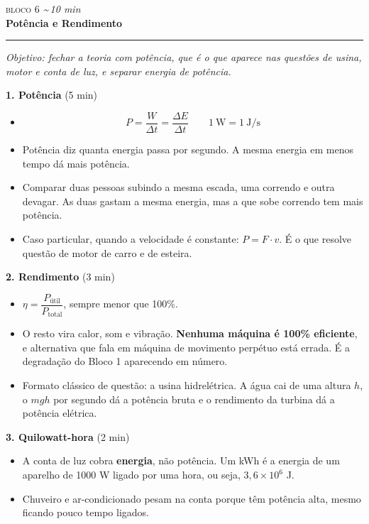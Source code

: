 \documentclass[11pt,a4paper]{article}
\newcommand{\bloco}[3]{%
  \needspace{7\baselineskip}
  \vspace{1.8em}
  {\scshape\color{vinho}bloco #1}\hfill
    {\small\itshape\color{grafite}\textasciitilde\,#3 min}\\[0.1em]
  {\Large\bfseries #2}\\[-0.55em]
  {\color{black!30}\rule{\linewidth}{0.5pt}}
  \par\nobreak\smallskip
}
\newcommand{\objetivo}[1]{{\itshape\color{grafite}Objetivo: #1}\par\smallskip}
\begin{document}
\bloco{6}{Pot\^encia e Rendimento}{10}

\objetivo{fechar a teoria com pot\^encia, que \'e o que aparece nas
quest\~oes de usina, motor e conta de luz, e separar energia de
pot\^encia.}

\begin{quadro}
\textbf{1. Pot\^encia} (5 min)
\begin{itemize}[nosep]
  \item
  \[
    \boxed{P = \frac{W}{\Delta t} = \frac{\Delta E}{\Delta t}}
    \qquad
    1\ \text{W} = 1\ \text{J/s}
  \]
  \item Pot\^encia diz quanta energia passa por
        segundo. A mesma energia em menos tempo d\'a mais pot\^encia.
  \item Comparar duas pessoas subindo a mesma escada, uma correndo e
        outra devagar. As duas gastam a mesma energia, mas a que sobe
        correndo tem mais pot\^encia.
  \item Caso particular, quando a velocidade \'e constante:
        $P = F\cdot v$. \'E o que resolve quest\~ao de motor de carro e
        de esteira.
\end{itemize}

\medskip
\textbf{2. Rendimento} (3 min)
\begin{itemize}[nosep]
  \item $\eta = \dfrac{P_{\text{\'util}}}{P_{\text{total}}}$, sempre
        menor que 100\%.
  \item O resto vira calor, som e vibra\c{c}\~ao. \textbf{Nenhuma
        m\'aquina \'e 100\% eficiente}, e alternativa que fala em
        m\'aquina de movimento perp\'etuo est\'a errada. \'E a
        degrada\c{c}\~ao do Bloco 1 aparecendo em n\'umero.
  \item Formato cl\'assico de quest\~ao: a usina hidrel\'etrica. A
        \'agua cai de uma altura $h$, o $mgh$ por segundo d\'a a
        pot\^encia bruta e o rendimento da turbina d\'a a pot\^encia
        el\'etrica.
\end{itemize}

\medskip
\textbf{3. Quilowatt-hora} (2 min)
\begin{itemize}[nosep]
  \item A conta de luz cobra \textbf{energia}, n\~ao pot\^encia. Um kWh
        \'e a energia de um aparelho de 1000 W ligado por uma hora, ou
        seja, $3{,}6\times 10^6$ J.
  \item Chuveiro e ar-condicionado pesam na conta porque t\^em
        pot\^encia alta, mesmo ficando pouco tempo ligados.
\end{itemize}
\end{quadro}
\end{document}
